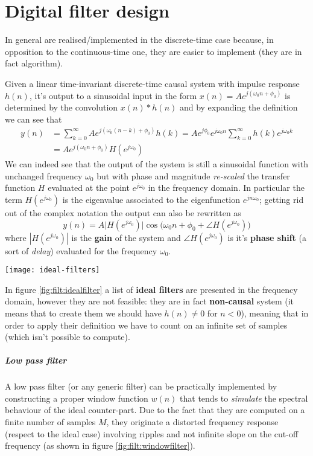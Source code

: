 \chapter{Digital filter design}
	
	In general  are realised/implemented in the discrete-time case because, in opposition to the continuous-time one, they are easier to implement (they are in fact algorithm).
	
	Given a linear time-invariant discrete-time causal system with impulse response $h(n)$, it's output to a sinusoidal input in the form $x(n) = A e^{j(\omega_0n + \phi_0)}$ is determined by the convolution $x(n)*h(n)$ and by expanding the definition we can see that
	\begin{align*}
		y(n) & = \sum_{k=0}^\infty A e^{j(\omega_0(n-k)+\phi_0)} h(k) = A e^{j\phi_0} e^{j\omega_0n} \sum_{k = 0}^\infty h(k) e^{j\omega_0k} \\
		& = A e^{j(\omega_0n+\phi_0)} H(e^{j\omega_0})
	\end{align*}
	We can indeed see that the output of the system is still a sinusoidal function with unchanged frequency $\omega_0$ but with phase and magnitude \textit{re-scaled} the transfer function $H$ evaluated at the point $e^{j\omega_0}$ in the frequency domain. In particular the term $H(e^{j\omega_0})$ is the eigenvalue associated to the eigenfunction $e^{jn\omega_0}$; getting rid out of the complex notation the output can also be rewritten as
	\[ y(n) = A \big| H(e^{j\omega_0}) \big| \cos\Big( \omega_0 n + \phi_0 +\angle H(e^{j\omega_0}) \Big) \]
	where $|H(e^{j\omega_0})|$ is the \textbf{gain} of the system and $\angle H(e^{j\omega_0})$ is it's \textbf{phase shift} (a sort of \textit{delay}) evaluated for the frequency $\omega_0$.
	
	\begin{SCfigure}[2][bht]
		\centering \texttt{[image: ideal-filters]}
		\caption{examples of ideal filters in the frequency domain.}
		\label{fig:filt:idealfilter}
	\end{SCfigure}
	
	In figure \ref{fig:filt:idealfilter} a list of \textbf{ideal filters} are presented in the frequency domain, however they are not feasible: they are in fact \textbf{non-causal} system (it means that to create them we should have $h(n)\neq 0$ for $n<0$), meaning that in order to apply their definition we have to count on an infinite set of samples (which isn't possible to compute).
	
	\paragraph{Low pass filter} A low pass filter (or any generic filter) can be practically implemented by constructing a proper window function $w(n)$ that tends to \textit{simulate} the spectral behaviour of the ideal counter-part. Due to the fact that they are computed on a finite number of samples $M$, they originate a distorted frequency response (respect to the ideal case) involving ripples and not infinite slope on the cut-off frequency (as shown in figure \ref{fig:filt:windowfilter}).
	
